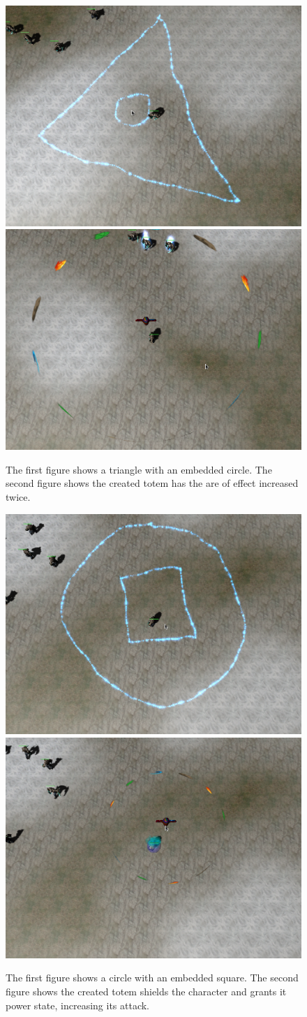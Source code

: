 \begin{figure}[p]
\centering
\includegraphics[width=.47\linewidth]{ext/scr/embcircle.png}
\quad
\includegraphics[width=.47\linewidth]{ext/scr/embcirclee.png}
\caption{The first figure shows a triangle with an embedded circle. The second figure shows the created totem has the are of effect increased twice. }
\label{fig:spell:embcircle}
\end{figure}

\begin{figure}[p]
\centering
\includegraphics[width=.47\linewidth]{ext/scr/embsquare.png}
\quad
\includegraphics[width=.47\linewidth]{ext/scr/embsquaree.png}
\caption{The first figure shows a circle with an embedded square. The second figure shows the created totem shields the character and grants it power state, increasing its attack.}
\label{fig:spell:embsquare}
\end{figure}

